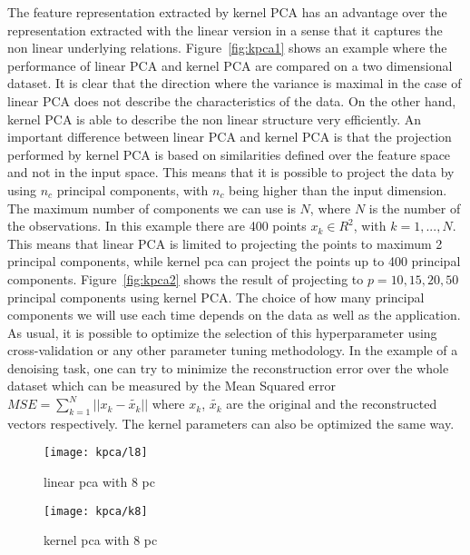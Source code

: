 \documentclass[conference,compsoc]{IEEEtran}
\begin{document}
The feature representation extracted by kernel PCA has an advantage over the representation extracted with the linear version in a sense that it captures the non linear underlying relations. Figure~\ref{fig:kpca1} shows an example where the performance of linear PCA and kernel PCA are compared on a two dimensional dataset. It is clear that the direction where the variance is maximal in the case of linear PCA does not describe the characteristics of the data. On the other hand, kernel PCA is able to describe the non linear structure very efficiently. 
An important difference between linear PCA and kernel PCA is that the projection performed by kernel PCA is based on similarities defined over the feature space and not in the input space. This means that it is possible to project the data by using $n_c$ principal components, with $n_c$ being higher than the input dimension. The maximum number of components we can use is $N$, where $N$ is the number of the observations. In this example there are 400 points $x_k \in R^2$, with $k=1,...,N$. This means that linear PCA is limited to projecting the points to maximum 2 principal components, while kernel pca can project the points up to 400 principal components. Figure~\ref{fig:kpca2} shows the result of projecting to $p=10,15,20,50$ principal components using kernel PCA. The choice of how many principal components we will use each time depends on the data as well as the application. As usual, it is possible to optimize the selection of this hyperparameter using cross-validation or any other parameter tuning methodology. In the example of a denoising task, one can try to minimize the reconstruction error over the whole dataset which can be measured by the Mean Squared error $MSE=\sum_{k=1}^{N}||x_k- \tilde{x_k}||$ where $x_k$, $\tilde{x_k}$ are the original and the reconstructed vectors respectively. The kernel parameters can also be optimized the same way.


\begin{figure*}[]
        \begin{subfigure}{0.45\linewidth}
            \texttt{[image: kpca/l8]}
            \caption{linear pca with 8 pc}
        \end{subfigure}
                \begin{subfigure}{0.45\linewidth}
            \texttt{[image: kpca/k8]}
            \caption{kernel pca with 8 pc}
        \end{subfigure}
                \centering
                    
\caption{Linear PCA and kernel PCA on a two dimensional dataset}        
                     
        \label{fig:kpca1}
    \end{figure*}
\end{document}
